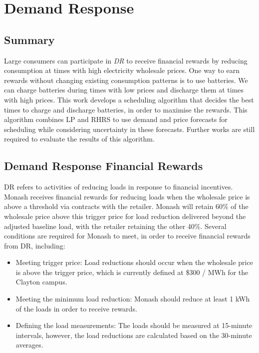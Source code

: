 \chapter{Demand Response}
\label{chp:dr}

\glsresetall

\section{Summary}

Large consumers can participate in \textit{\acrlong{DR}} to receive financial rewards by reducing consumption at times with high electricity wholesale prices.
One way to earn rewards without changing existing consumption patterns is to use batteries.
We can charge batteries during times with low prices and discharge them at times with high prices.
This work develops a scheduling algorithm that decides the best times to charge and discharge batteries, in order to maximise the rewards.
This algorithm combines \acrlong{LP} and \acrlong{RHRS} to use demand and price forecasts for scheduling while considering uncertainty in these forecasts. 
Further works are still required to evaluate the results of this algorithm. 


\section{Demand Response Financial Rewards}
\label{dr:rewards}

\Gls{DR} refers to activities of reducing loads in response to financial incentives. 
Monash receives financial rewards for reducing loads when the wholesale price is above a threshold via contracts with the retailer. Monash will retain 60\% of the wholesale price above this trigger price for load reduction delivered beyond the adjusted baseline load, with the retailer retaining the other 40\%. 
Several conditions are required for Monash to meet, in order to receive financial rewards from \gls{DR}, including:
\begin{itemize}
	\item Meeting trigger price: Load reductions should occur when the wholesale price is above the trigger price, which is currently defined at \$300 / MWh for the Clayton campus.
	
	\item Meeting the minimum load reduction: Monash should reduce at least 1 kWh of the loads in order to receive rewards. 
	
	\item Defining the load measurements: The loads should be measured at 15-minute intervals, however, the load reductions are calculated based on the 30-minute averages. 
	
\end{itemize}

